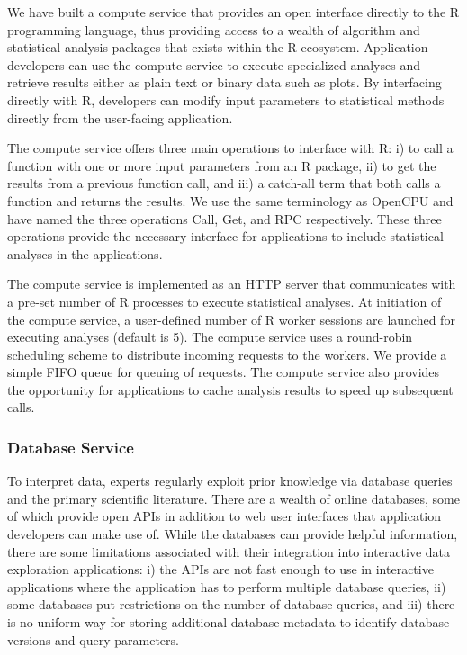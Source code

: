 We have built a compute service that provides an open interface directly to the
R programming language, thus providing access to a wealth of algorithm and
statistical analysis packages that exists within the R ecosystem.  
Application developers can use the compute service to execute specialized
analyses and retrieve results either as plain text or binary data such as plots.
By interfacing directly with R, developers can modify input parameters to
statistical methods directly from the user-facing application. 

The compute service offers three main operations to interface with R: i) to call
a function with one or more input parameters from an R package, ii) to get the
results from a previous function call, and iii) a catch-all term that both calls
a function and returns the results.  We use the same terminology as
OpenCPU\cite{opencpu} and have named the three operations Call, Get, and RPC
respectively. These three operations provide the necessary interface for
applications to include statistical analyses in the applications.

The compute service is implemented as an HTTP server that communicates with a
pre-set number of R processes to execute statistical analyses. 
At initiation of the compute service, a user-defined number of R worker sessions
are launched for executing analyses (default is 5).  
The compute service uses a round-robin scheduling scheme to distribute incoming
requests to the workers. We provide a simple FIFO queue for queuing of requests.
The compute service also provides the opportunity for applications to cache
analysis results to speed up subsequent calls. 

\subsubsection*{Database Service} 
To interpret data, experts regularly exploit prior knowledge via database
queries and the primary scientific literature.  There are a wealth of online
databases, some of which provide open APIs in addition to web user interfaces
that application developers can make use of.  While the databases can provide
helpful information, there are some limitations associated with their
integration into interactive data exploration applications: 
i) the APIs are not fast enough to use in interactive applications where the
application has to perform multiple database queries, 
ii) some databases put restrictions on the number of database queries, and 
iii) there is no uniform way for storing additional database metadata to
identify database versions and query parameters. 

